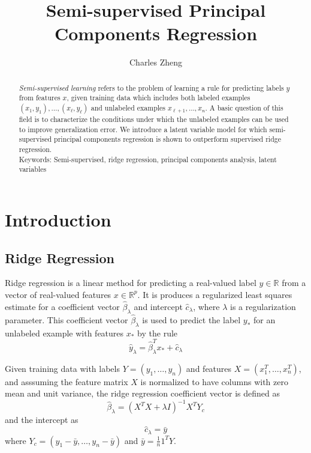 \documentclass[11pt]{article}
\begin{document}
\newcommand{\tr}{\text{tr}}
\newcommand{\E}{\textbf{E}}
\newcommand{\diag}{\text{diag}}
\newcommand{\argmax}{\text{argmax}}
\newcommand{\argmin}{\text{argmin}}
\newcommand{\Cov}{\text{Cov}}
\newcommand{\Vol}{\text{Vol}}
\pagestyle{fancy}

\title{Semi-supervised Principal Components Regression}

\author{Charles Zheng}

\maketitle

\begin{abstract}
\emph{Semi-supervised learning} refers to the problem of learning a
rule for predicting labels $y$ from features $x$, given training data
which includes both labeled examples $(x_1, y_1), \hdots, (x_\ell,
y_\ell)$ and unlabeled examples $x_{\ell + 1}, \hdots, x_n$.  A basic
question of this field is to characterize the conditions under which
the unlabeled examples can be used to improve generalization error.
We introduce a latent variable model for which semi-supervised
principal components regression is shown to outperform supervised
ridge regression.\\

Keywords: Semi-supervised, ridge regression,
principal components analysis, latent variables
\end{abstract}

\section{Introduction}

\subsection{Ridge Regression}

Ridge regression is a linear method for predicting a real-valued label
$y \in \mathbb{R}$ from a vector of real-valued features $x \in
\mathbb{R}^p$.  It is produces a regularized least squares estimate
for a coefficient vector $\hat{\beta}_\lambda$ and intercept
$\hat{c}_\lambda$, where $\lambda$ is a regularization parameter.  This
coefficient vector $\hat{\beta}_\lambda$ is used to predict the label
$y_*$ for an unlabeled example with features $x_*$ by the rule
\[
\hat{y}_\lambda = \hat{\beta}_\lambda^T x_* + \hat{c}_\lambda
\]

Given training data with labels $Y = (y_1,\hdots, y_n)$ and features
$X = (x_1^T,\hdots, x_n^T)$, and asssuming the feature matrix $X$ is
normalized to have columns with zero mean and unit variance,
the ridge regression coefficient vector is defined as
\[
\hat{\beta}_\lambda = (X^T X + \lambda I)^{-1} X^T Y_c
\]
and the intercept as
\[
\hat{c}_\lambda = \bar{y}
\]
where $Y_c = (y_1 - \bar{y},\hdots, y_n - \bar{y})$ and $\bar{y} =
\frac{1}{n}1^T Y$.
\end{document}

